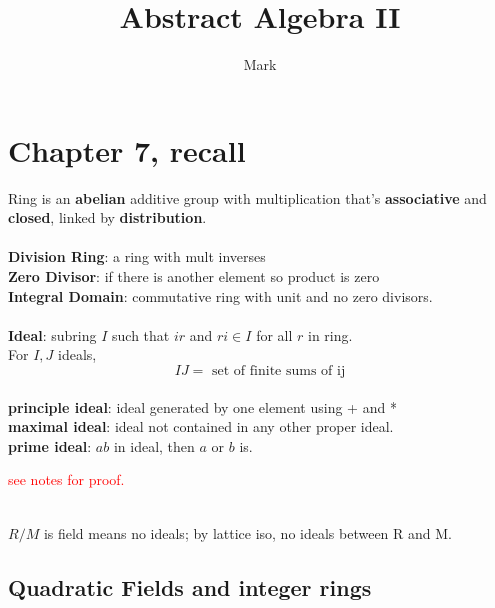 \documentclass[12pt]{article}
\title{Abstract Algebra II}
\author{Mark}
\date{}
\begin{document}
\maketitle

\section*{Chapter 7, recall}
Ring is an \textbf{abelian} additive group with multiplication that's \textbf{associative} and \textbf{closed}, linked by \textbf{distribution}.\\
\ \\
\noindent\textbf{Division Ring}: a ring with mult inverses \\
\textbf{Zero Divisor}: if there is another element so product is zero\\
\textbf{Integral Domain}: commutative ring with unit and no zero divisors.\\

\ \\
\textbf{Ideal}: subring $I$ such that $ir$ and $ri \in I$ for all $r$ in ring.\\
For $I, J$ ideals, 
$$IJ = \text{ set of finite sums of ij}$$
\ \\
\textbf{principle ideal}: ideal generated by one element using + and *\\
\textbf{maximal ideal}: ideal not contained in any other proper ideal.\\
\textbf{prime ideal}: $ab$ in ideal, then $a$ or $b$ is.\\

\centerline{
}
\textcolor{red}{see notes for proof.}


\centerline{}\\
\textcolor[gray]{0.5}{$R / M$ is field means no ideals; by lattice iso, no ideals between R and M.}


\subsection*{Quadratic Fields and integer rings}
\end{document}
